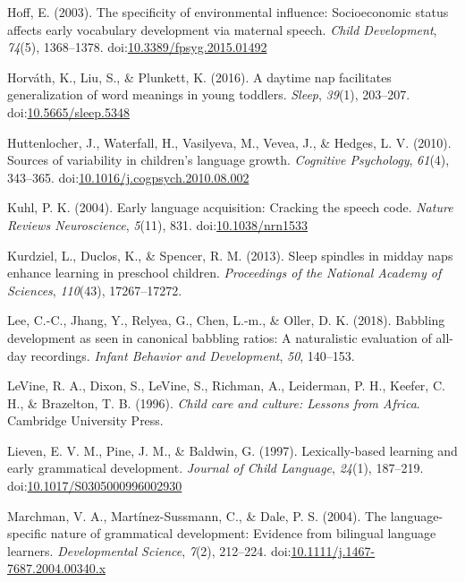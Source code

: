 \documentclass[,man,floatsintext]{apa6}
\begin{document}
\hypertarget{ref-hoff2003specificity}{}
Hoff, E. (2003). The specificity of environmental influence:
Socioeconomic status affects early vocabulary development via maternal
speech. \emph{Child Development}, \emph{74}(5), 1368--1378.
doi:\href{https://doi.org/10.3389/fpsyg.2015.01492}{10.3389/fpsyg.2015.01492}

\hypertarget{ref-horvath2016daytime}{}
Horváth, K., Liu, S., \& Plunkett, K. (2016). A daytime nap facilitates
generalization of word meanings in young toddlers. \emph{Sleep},
\emph{39}(1), 203--207.
doi:\href{https://doi.org/10.5665/sleep.5348}{10.5665/sleep.5348}

\hypertarget{ref-huttenlocher2010sources}{}
Huttenlocher, J., Waterfall, H., Vasilyeva, M., Vevea, J., \& Hedges, L.
V. (2010). Sources of variability in children's language growth.
\emph{Cognitive Psychology}, \emph{61}(4), 343--365.
doi:\href{https://doi.org/10.1016/j.cogpsych.2010.08.002}{10.1016/j.cogpsych.2010.08.002}

\hypertarget{ref-kuhl2004early}{}
Kuhl, P. K. (2004). Early language acquisition: Cracking the speech
code. \emph{Nature Reviews Neuroscience}, \emph{5}(11), 831.
doi:\href{https://doi.org/10.1038/nrn1533}{10.1038/nrn1533}

\hypertarget{ref-kurdziel2013sleep}{}
Kurdziel, L., Duclos, K., \& Spencer, R. M. (2013). Sleep spindles in
midday naps enhance learning in preschool children. \emph{Proceedings of
the National Academy of Sciences}, \emph{110}(43), 17267--17272.

\hypertarget{ref-lee2018babbling}{}
Lee, C.-C., Jhang, Y., Relyea, G., Chen, L.-m., \& Oller, D. K. (2018).
Babbling development as seen in canonical babbling ratios: A
naturalistic evaluation of all-day recordings. \emph{Infant Behavior and
Development}, \emph{50}, 140--153.

\hypertarget{ref-levine1996child}{}
LeVine, R. A., Dixon, S., LeVine, S., Richman, A., Leiderman, P. H.,
Keefer, C. H., \& Brazelton, T. B. (1996). \emph{Child care and culture:
Lessons from Africa}. Cambridge University Press.

\hypertarget{ref-lieven1997lexically}{}
Lieven, E. V. M., Pine, J. M., \& Baldwin, G. (1997). Lexically-based
learning and early grammatical development. \emph{Journal of Child
Language}, \emph{24}(1), 187--219.
doi:\href{https://doi.org/10.1017/S0305000996002930}{10.1017/S0305000996002930}

\hypertarget{ref-marchman2004language}{}
Marchman, V. A., Martínez-Sussmann, C., \& Dale, P. S. (2004). The
language-specific nature of grammatical development: Evidence from
bilingual language learners. \emph{Developmental Science}, \emph{7}(2),
212--224.
doi:\href{https://doi.org/10.1111/j.1467-7687.2004.00340.x}{10.1111/j.1467-7687.2004.00340.x}
\end{document}

